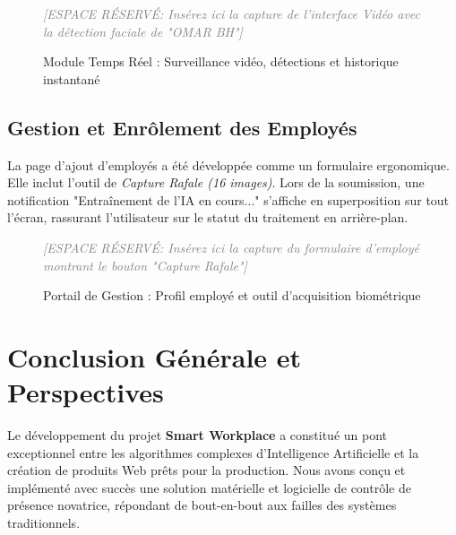 \documentclass[12pt,a4paper]{report}
\begin{document}
\begin{figure}[H]
    \centering
    \begin{tcolorbox}[colback=lightbg, colframe=primary, width=0.95\textwidth, height=7cm, valign=center, halign=center, arc=2mm]
        \textcolor{gray}{\Large \textit{[ESPACE RÉSERVÉ: Insérez ici la capture de l'interface Vidéo avec la détection faciale de "OMAR BH"]}}
    \end{tcolorbox}
    \caption{Module Temps Réel : Surveillance vidéo, détections et historique instantané}
\end{figure}

\section{Gestion et Enrôlement des Employés}
La page d'ajout d'employés a été développée comme un formulaire ergonomique. Elle inclut l'outil de \textit{Capture Rafale (16 images)}. Lors de la soumission, une notification "Entraînement de l'IA en cours..." s'affiche en superposition sur tout l'écran, rassurant l'utilisateur sur le statut du traitement en arrière-plan.

\begin{figure}[H]
    \centering
    \begin{tcolorbox}[colback=lightbg, colframe=primary, width=0.95\textwidth, height=7cm, valign=center, halign=center, arc=2mm]
        \textcolor{gray}{\Large \textit{[ESPACE RÉSERVÉ: Insérez ici la capture du formulaire d'employé montrant le bouton "Capture Rafale"]}}
    \end{tcolorbox}
    \caption{Portail de Gestion : Profil employé et outil d'acquisition biométrique}
\end{figure}

\chapter{Conclusion Générale et Perspectives}

Le développement du projet \textbf{Smart Workplace} a constitué un pont exceptionnel entre les algorithmes complexes d'Intelligence Artificielle et la création de produits Web prêts pour la production. Nous avons conçu et implémenté avec succès une solution matérielle et logicielle de contrôle de présence novatrice, répondant de bout-en-bout aux failles des systèmes traditionnels.
\end{document}
